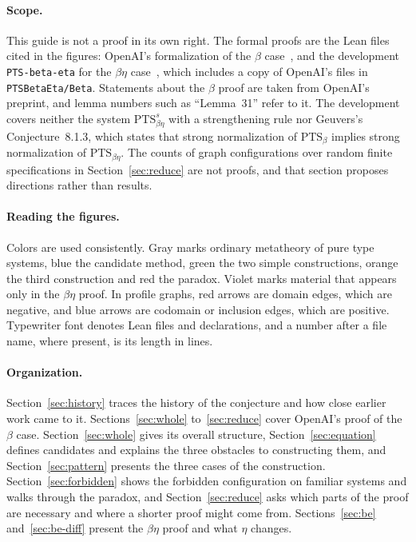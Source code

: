 \documentclass[10pt]{article}
\begin{document}
\paragraph{Scope.} This guide is not a proof in its own right. The formal proofs are
the Lean files cited in the figures: OpenAI's formalization of the $\beta$
case~\cite{OpenAI2026}, and the development \texttt{PTS-beta-eta} for the
$\beta\eta$ case~\cite{PTSbetaetaLean}, which includes a copy of OpenAI's files in
\texttt{PTSBetaEta/Beta}. Statements about the $\beta$ proof are taken from
OpenAI's preprint, and lemma numbers such as ``Lemma~31'' refer to it. The
development covers neither the system $\mathrm{PTS}^s_{\beta\eta}$ with a
strengthening rule nor Geuvers's Conjecture~8.1.3, which states that strong
normalization of $\mathrm{PTS}_\beta$ implies strong normalization of
$\mathrm{PTS}_{\beta\eta}$. The counts of graph configurations over random finite
specifications in Section~\ref{sec:reduce} are not proofs, and that section
proposes directions rather than results.

\paragraph{Reading the figures.} Colors are used consistently. Gray marks ordinary
metatheory of pure type systems, blue the candidate method, green the two simple
constructions, orange the third construction and red the paradox. Violet marks
material that appears only in the $\beta\eta$ proof. In profile graphs, red arrows
are domain edges, which are negative, and blue arrows are codomain or inclusion
edges, which are positive. Typewriter font denotes Lean files and declarations, and
a number after a file name, where present, is its length in lines.

\paragraph{Organization.} Section~\ref{sec:history} traces the history of the
conjecture and how close earlier work came to it. Sections~\ref{sec:whole}
to~\ref{sec:reduce} cover OpenAI's proof of the $\beta$ case.
Section~\ref{sec:whole} gives its overall structure, Section~\ref{sec:equation}
defines candidates and explains the three obstacles to constructing them, and
Section~\ref{sec:pattern} presents the three cases of the construction.
Section~\ref{sec:forbidden} shows the forbidden configuration on familiar systems
and walks through the paradox, and Section~\ref{sec:reduce} asks which parts of the
proof are necessary and where a shorter proof might come from.
Sections~\ref{sec:be} and~\ref{sec:be-diff} present the $\beta\eta$ proof and what
$\eta$ changes.
\end{document}
